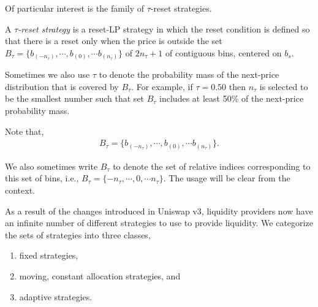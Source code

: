 \documentclass[sigconf, usenames, dvipsnames]{acmart}
\newcommand{\dcp}[1]{\textcolor{blue}{{\scriptsize{David:}}#1}}
\begin{document}

%
Of particular interest is the family of $\tau$-reset strategies.
%
\begin{definition}
A {\em $\tau$-reset strategy} is a reset-LP strategy in which the reset condition is defined 
so that there is a reset only when the price is outside the set 
$B_{\tau} = \{b_{(-n_{\tau})}, \cdots, b_{(0)}, \cdots b_{(n_{\tau})}\}$ of $2 n_{\tau} + 1$ of contiguous bins,  centered on  $b_{s}$.
\end{definition}

Sometimes we also use $\tau$ to denote the probability mass of the next-price distribution that is covered by $B_\tau$. For example, if $\tau=0.50$ then $n_\tau$ is selected to be the smallest number such that set $B_\tau$ includes at least 50\% of the next-price probability mass.

Note that,
\begin{align}
    B_{\tau} = \{b_{(-n_{\tau})}, \cdots, b_{(0)}, \cdots b_{(n_{\tau})}\}.
\end{align}

\fi

We also sometimes write $B_{\tau}$ to denote the set of relative indices corresponding to this set of bins, i.e., $B_{\tau} = \{-n_{\tau}, \cdots, 0, \cdots n_{\tau}\}$. The usage  will be clear from the context.


As a result of the changes introduced in Uniswap v3, liquidity providers now have an infinite number of different strategies to use to provide liquidity. We categorize the sets of strategies into three classes,
\begin{enumerate}
    \item fixed strategies,
    \item moving, constant allocation strategies, and
    \item adaptive strategies.
\end{enumerate}
\end{document}
